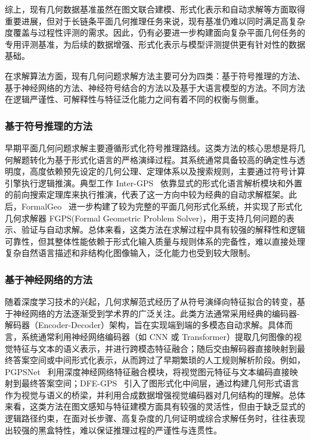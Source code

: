 综上，现有几何数据基准虽然在图文联合建模、形式化表示和自动求解等方面取得重要进展，但对于长链条平面几何推理任务来说，现有基准仍难以同时满足高复杂度覆盖与过程性评测的需求。因此，仍有必要进一步构建面向复杂平面几何任务的专用评测基准，为后续的数据增强、形式化表示与模型评测提供更有针对性的数据基础。



在求解算法方面，现有几何问题求解方法主要可分为四类：基于符号推理的方法、基于神经网络的方法、神经符号结合的方法以及基于大语言模型的方法。不同方法在逻辑严谨性、可解释性与特征泛化能力之间有着不同的权衡与侧重。

\subsubsection{基于符号推理的方法}

早期平面几何问题求解主要遵循形式化符号推理路线。这类方法的核心思想是将几何解题转化为基于形式化语言的严格演绎过程。其系统通常具备较高的确定性与透明度，高度依赖预先设定的几何公理、定理体系以及搜索规则，主要通过符号计算引擎执行逻辑推演。典型工作 Inter-GPS~\cite{lu2021intergps} 依靠显式的形式化语言解析模块和外置的前向搜索定理库来执行推演，代表了这一方向中较为经典的自动求解框架。此后，FormalGeo~\cite{zhang2023formalgeo} 进一步构建了较为完整的平面几何形式化系统，并实现了形式化几何求解器 FGPS(Formal Geometric Problem Solver)，用于支持几何问题的表示、验证与自动求解。总体来看，这类方法在求解过程中具有较强的解释性和逻辑可靠性，但其整体性能依赖于形式化输入质量与规则体系的完备性，难以直接处理复杂自然语言描述和非结构化图像输入，泛化能力也受到较大限制。

\subsubsection{基于神经网络的方法}

随着深度学习技术的兴起，几何求解范式经历了从符号演绎向特征拟合的转变，基于神经网络的方法逐渐受到学术界的广泛关注。此类方法通常采用经典的编码器-解码器（Encoder-Decoder）架构，旨在实现端到端的多模态自动求解。具体而言，系统通常利用神经网络编码器（如 CNN 或 Transformer）提取几何图像的视觉特征与文本的语义表示，并进行跨模态特征融合；随后交由解码器直接映射到最终答案空间或中间形式化表示，从而跨过了早期繁琐的人工规则解析阶段。例如，PGPSNet~\cite{zhang2023pgps} 利用深度神经网络特征融合模块，将视觉图元特征与文本编码直接映射到最终答案空间；DFE-GPS~\cite{zhang2025dfegps} 引入了图形式化中间层，通过构建几何形式语言作为视觉与语义的桥梁，并利用合成数据增强视觉编码器对几何结构的理解。总体来看，这类方法在图文感知与特征建模方面具有较强的灵活性，但由于缺乏显式的逻辑路径约束，在面对长步骤、高复杂度的几何证明或综合求解任务时，往往表现出较强的黑盒特性，难以保证推理过程的严谨性与连贯性。

